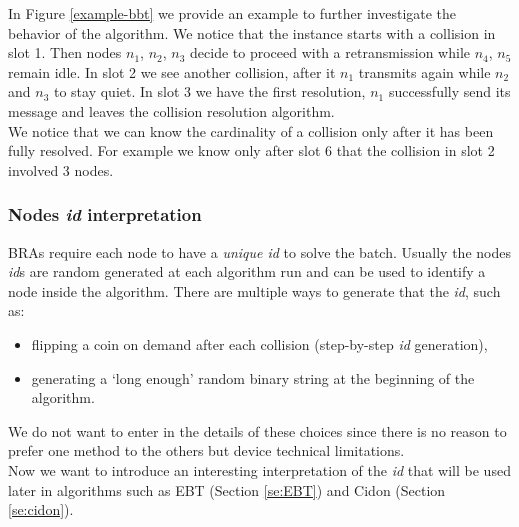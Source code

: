 \documentclass[12pt,a4paper]{report}
\begin{document}
In Figure \ref{example-bbt} we provide an example to further investigate the behavior of the algorithm. We notice that the instance starts with a collision in slot 1. Then nodes $n_{1}$, $n_{2}$, $n_{3}$ decide to proceed with a retransmission while $n_{4}$, $n_{5}$ remain idle. In slot 2 we see another collision, after it $n_{1}$ transmits again while $n_{2}$ and $ n_{3}$ to stay quiet. In slot 3 we have the first resolution, $n_{1}$ successfully send its message and leaves the collision resolution algorithm.\\
We notice that we can know the cardinality of a collision only after it has been fully  resolved. For example we know only after slot 6 that the collision in slot 2 involved 3 nodes.\\

\subsubsection{Nodes \emph{id} interpretation}
\label{realvalueapproach}
BRAs require each node to have a \emph{unique id} to solve the batch. Usually the nodes \emph{id}s are random generated at each algorithm run and can be used to identify a node inside the algorithm. 
There are multiple ways to generate that the \emph{id}, such as:
\begin{itemize}
\item flipping a coin on demand after each collision (step-by-step \emph{id} generation),
\item generating a `long enough' random binary string  at the beginning of the algorithm.
\end{itemize}
We do not want to enter in the details of these choices since there is no reason to prefer one method to the others but device technical limitations.\\ 
Now we want to introduce an interesting interpretation of the \emph{id} that will be used later in algorithms such as EBT (Section \ref{se:EBT}) and Cidon (Section \ref{se:cidon}).\\
\end{document}

